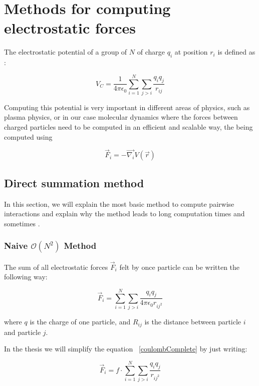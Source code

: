 \documentclass[12pt,twoside,a4paper]{report}
\begin{document}
\chapter{Methods for computing electrostatic forces}

The electrostatic potential of a group of $N$ of charge $q_i$ at position $r_i$ is defined as :

\begin{equation}
V_C = \frac{1}{4\pi\epsilon_0} \sum\limits_{i=1}^{N}\sum\limits_{j>i} \frac{q_i q_j}{r_{ij}}
\end{equation}

Computing this potential is very important in different areas of physics, such as plasma physics, or in our case molecular dynamics where the forces between charged particles need to be computed in an efficient and scalable way, the being computed using

\begin{equation}
	\vec{F}_i = - \vec{\nabla_i} V(\vec{r})
\end{equation}


\section{Direct summation method }


In this section, we will explain the most basic method to compute pairwise interactions and explain why the method leads to long computation times and sometimes .

\subsection{Naive $\mathcal{O}(N^2)$ Method}

The sum of all electrostatic forces $\vec{F}_i$ felt by once particle can be written the following way:

\begin{equation}
	\vec{F}_i =  \sum\limits_{i=1}^{N}\sum\limits_{j>i} \frac{q_i q_j}{4\pi\epsilon_0 r_{ij^2}}
	\label{coulombComplete}
\end{equation}

where $q$ is the charge of one particle, and $R_{ij}$ is the distance between particle $i$ and particle $j$.

In the thesis we will simplify the equation ~\eqref{coulombComplete} by just writing:

\begin{equation}
	\vec{F}_i =  f\cdot\sum\limits_{i=1}^{N}\sum\limits_{j>i} \frac{q_i q_j}{r_{ij^2}}
	\label{coulombSimplified}
\end{equation}
\end{document}
